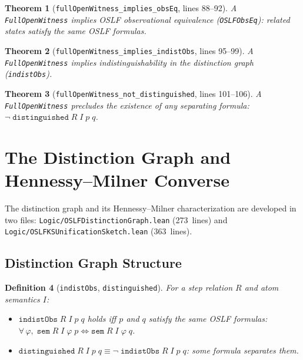 \documentclass[11pt]{article}
\newtheorem{theorem}{Theorem}[section]
\newtheorem{definition}[theorem]{Definition}
\begin{document}
\begin{theorem}[\texttt{fullOpenWitness\_implies\_obsEq}, lines 88--92]\label{thm:oslf-obseq}
A \texttt{FullOpenWitness} implies OSLF observational equivalence
(\texttt{OSLFObsEq}): related states satisfy the same OSLF formulas.
\end{theorem}

\begin{theorem}[\texttt{fullOpenWitness\_implies\_indistObs}, lines 95--99]\label{thm:oslf-indist}
A \texttt{FullOpenWitness} implies indistinguishability in the
distinction graph (\texttt{indistObs}).
\end{theorem}

\begin{theorem}[\texttt{fullOpenWitness\_not\_distinguished}, lines 101--106]\label{thm:oslf-nodist}
A \texttt{FullOpenWitness} precludes the existence of any separating
formula: $\neg\;\texttt{distinguished}\;R\;I\;p\;q$.
\end{theorem}


\section{The Distinction Graph and Hennessy--Milner Converse}\label{sec:hm}

The distinction graph and its Hennessy--Milner characterization are
developed in two files:
\texttt{Logic/OSLFDistinctionGraph.lean} (273~lines) and
\texttt{Logic/OSLFKSUnificationSketch.lean} (363~lines).

\subsection{Distinction Graph Structure}

\begin{definition}[\texttt{indistObs}, \texttt{distinguished}]
For a step relation $R$ and atom semantics $I$:
\begin{itemize}
\item $\texttt{indistObs}\;R\;I\;p\;q$ holds iff $p$ and $q$ satisfy
  the same OSLF formulas: $\forall\,\varphi,\;
  \texttt{sem}\;R\;I\;\varphi\;p \iff \texttt{sem}\;R\;I\;\varphi\;q$.
\item $\texttt{distinguished}\;R\;I\;p\;q \equiv
  \neg\;\texttt{indistObs}\;R\;I\;p\;q$: some formula separates them.
\end{itemize}
\end{definition}
\end{document}
